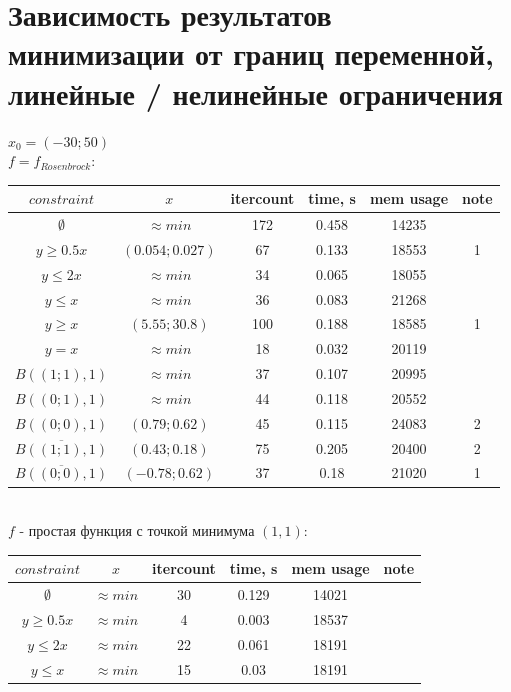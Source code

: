 \documentclass[a4paper,14pt,oneside,openany]{memoir}
\begin{document}
\section{Зависимость результатов минимизации от границ переменной, линейные / нелинейные ограничения}
\FloatBarrier
\begin{table}
\centering
$x_0 = (-30; 50)$ \\
$f = f_{Rosenbrock}$: \\
\begin{tabular}{|c|c|c|c|c|c| }
	\hline
	$constraint$ & $x$ & itercount & time, s & mem usage & note \\
	\hline
	$\emptyset$ & $\approx min$ & 172 & 0.458 & 14235 & \\
	\hline
	$y \ge 0.5x$ & $(0.054; 0.027)$ & 67 & 0.133 & 18553 & 1 \\
	\hline
	$y \le 2x$ & $\approx min$ & 34 & 0.065 & 18055 & \\
	\hline
	$y \le x$ & $\approx min$ & 36 & 0.083 & 21268 & \\
	\hline
	$y \ge x$ & $(5.55; 30.8)$ & 100 & 0.188 & 18585 & 1 \\
	\hline
	$y = x$ & $\approx min$ & 18 & 0.032 & 20119 & \\
	\hline
	$B((1; 1), 1)$ & $\approx min$ & 37 & 0.107 & 20995 & \\
	\hline
	$B((0; 1), 1)$ & $\approx min$ & 44 & 0.118 & 20552 & \\
	\hline
	$B((0; 0), 1)$ & $(0.79; 0.62)$ & 45 & 0.115 & 24083 & 2 \\
	\hline
	$\overline{B((1; 1), 1)} $ & $(0.43; 0.18)$ & 75 & 0.205 & 20400 & 2 \\
	\hline
	$\overline{B((0; 0), 1)}$ & $(-0.78; 0.62)$ & 37 & 0.18 & 21020 & 1 \\
	\hline
\end{tabular} \\
$f$ - простая функция с точкой минимума $(1, 1)$: \\
\begin{tabular}{|c|c|c|c|c|c| }
	\hline
	$constraint$ & $x$ & itercount & time, s & mem usage & note \\
	\hline
	$\emptyset$ & $\approx min$ & 30 & 0.129 & 14021 & \\
	\hline
	$y \ge 0.5x$ & $\approx min$ & 4 & 0.003 & 18537 & \\
	\hline
	$y \le 2x$ & $\approx min$ & 22 & 0.061 & 18191 & \\
	\hline
	$y \le x$ & $\approx min$ & 15 & 0.03 & 18191 & \\

\end{tabular}
\end{table}
\end{document}
